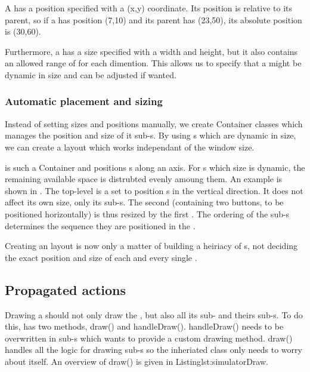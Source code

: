 A  has a position specified with a (x,y) coordinate. Its
position is relative to its parent, so if a  has position
(7,10) and its parent has (23,50), its absolute position is (30,60).

Furthermore, a  has a size specified with a width and height,
but it also contains an allowed range of for each dimention. This allows us to
specify that a  might be dynamic in size and can be adjusted if
wanted.


\subsubsection{Automatic placement and sizing}

Instead of setting sizes and positions manually, we create Container classes
which manages the position and size of it sub-s. By using
s which are dynamic in size, we can create a layout which works
independant of the window size.

 is such a Container  and positions
s along an axis. For s which size is dynamic,
the remaining available space is distrubted evenly amoung them. An example is
shown in . The top-level  is a
 set to position s in the vertical
direction. It does not affect its own size, only its sub-s. The
second  (containing two buttons, to be positioned
horizontally) is thus resized by the first . The
ordering of the sub-s determines the sequence they are
positioned in the .


Creating an layout is now only a matter of building a heiriacy of
s, not deciding the exact position and size of each and every
single .


\subsection{Propagated actions}

Drawing a  should not only draw the , but also
all its sub- and theirs sub-s. To do this,
 has two methods, draw() and handleDraw(). handleDraw() needs
to be overwritten in sub-s which wants to provide a custom
drawing method. draw() handles all the logic for drawing sub-s
so the inheriated class only needs to worry about itself. An overview of draw()
is given in Listing{lst:simulatorDraw}.


